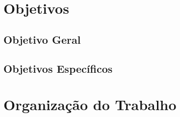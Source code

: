 



\section{Objetivos}
\subsection{Objetivo Geral}
\subsection{Objetivos Específicos}

\section{Organização do Trabalho}